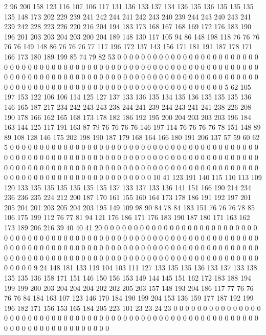 2 96 200 158 123 116 107 106 117 131 136 133 137 134 136 135 136 135 135 135
135 148 173 202 229 239 241 242 244 241 242 243 240 239 244 243 240 243 241 239
242 228 223 226 220 216 204 194 183 173 168 167 168 169 172 176 183 190 196 201
203 203 204 203 200 204 189 148 130 117 105 94 86 148 198 118 76 76 76 76
76 149 148 86 76 76 76 77 117 196 172 137 143 156 171 181 191 187 178 171
166 173 180 189 199 85 74 79 82 53 0 0 0 0 0 0 0 0 0 0
0 0 0 0 0 0 0 0 0 0 0 0 0 0 0 0 0 0 0 0
0 0 0 0 0 0 0 0 0 0 0 0 0 0 0 0 0 0 0 0
0 0 0 0 0 0 0 0 0 0 0 0 0 0 0 0 0 0 0 0
0 0 0 0 0 0 0 0 0 0 0 0 0 0 0 0 0 0 0 0
0 0 0 0 0 0 0 0 0 0 0 0 0 0 0 0 0 0 0 0
0 0 0 0 0 0 0 0 0 0 0 0 0 0 0 0 0 0 0 0
0 0 0 0 0 0 0 0 0 0 0 0 0 0 0 0 0 5 62 105
197 153 122 106 106 114 125 127 137 133 136 135 134 135 136 135 135 135 136 146
165 187 217 234 242 243 243 238 244 241 239 244 243 241 241 238 226 208 190 178
166 162 165 168 173 178 182 186 192 195 200 204 203 203 203 196 184 163 144 125
117 191 163 87 79 76 76 76 76 146 197 114 76 76 76 76 78 151 148 89
89 108 128 146 175 202 198 190 187 179 168 164 166 180 191 206 137 57 59 60
62 5 0 0 0 0 0 0 0 0 0 0 0 0 0 0 0 0 0 0
0 0 0 0 0 0 0 0 0 0 0 0 0 0 0 0 0 0 0 0
0 0 0 0 0 0 0 0 0 0 0 0 0 0 0 0 0 0 0 0
0 0 0 0 0 0 0 0 0 0 0 0 0 0 0 0 0 0 0 0
0 0 0 0 0 0 0 0 0 0 0 0 0 0 0 0 0 0 0 0
0 0 0 0 0 0 0 0 0 0 0 0 0 0 0 0 0 0 0 0
0 0 0 0 0 0 0 0 0 0 0 0 0 0 0 0 0 0 0 0
0 0 0 0 0 0 0 0 0 0 0 0 0 0 0 10 41 123 191 140
115 110 113 109 120 133 135 135 135 135 135 135 137 133 137 133 136 141 151 166
190 214 234 236 236 235 224 212 200 187 170 161 155 160 164 173 178 186 191 192
197 201 205 204 201 203 205 204 203 195 149 109 98 90 84 78 84 183 151 76
76 76 78 85 106 175 199 112 76 77 81 94 121 176 186 171 176 183 190 187
180 171 163 162 173 189 206 216 39 40 40 41 20 0 0 0 0 0 0 0
0 0 0 0 0 0 0 0 0 0 0 0 0 0 0 0 0 0 0 0
0 0 0 0 0 0 0 0 0 0 0 0 0 0 0 0 0 0 0 0
0 0 0 0 0 0 0 0 0 0 0 0 0 0 0 0 0 0 0 0
0 0 0 0 0 0 0 0 0 0 0 0 0 0 0 0 0 0 0 0
0 0 0 0 0 0 0 0 0 0 0 0 0 0 0 0 0 0 0 0
0 0 0 0 0 0 0 0 0 0 0 0 0 0 0 0 0 0 0 0
0 0 0 0 0 0 0 0 0 0 0 0 0 0 0 0 0 0 0 0
0 0 0 0 0 0 0 0 0 0 0 0 0 9 24 148 181 133 119 104
103 111 127 133 135 135 136 133 137 133 138 135 135 136 158 171 151 146 150 156
153 149 144 145 151 162 172 183 188 194 199 199 200 203 204 204 204 202 202 205
203 157 148 193 204 186 117 77 76 76 76 76 84 184 163 107 123 146 170 184
190 199 204 153 136 159 177 187 192 199 196 182 171 156 153 165 184 205 223 101
23 23 24 23 0 0 0 0 0 0 0 0 0 0 0 0 0 0 0 0
0 0 0 0 0 0 0 0 0 0 0 0 0 0 0 0 0 0 0 0
0 0 0 0 0 0 0 0 0 0 0 0 0 0 0 0 0 0 0 0
0 0 0 0 0 0 0 0 0 0 0 0 0 0 0 0 0 0 0 0
